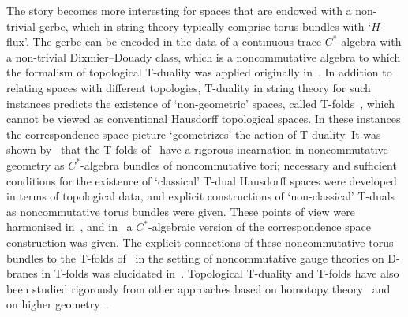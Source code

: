\documentclass[pdftex]{sigma}
\numberwithin{equation}{section}
\begin{document}
The story becomes more interesting for spaces that are endowed with a
non-trivial gerbe, which in string theory typically comprise torus
bundles with `$H$-flux'. The gerbe can be encoded in the data of a
continuous-trace $C^*$-algebra with a non-trivial Dixmier--Douady
class, which is a noncommutative algebra to which the formalism of
topological T-duality was applied originally
in~\cite{Bouwknegt2003,Mathai2004,Mathai2005}. In addition to relating
spaces with different topologies, T-duality in string theory for such
instances predicts the existence of `non-geometric' spaces, called T-folds~\cite{Hull2004},
which cannot be viewed as conventional Hausdorff topological
spaces. In these instances the correspondence space picture
`geometrizes' the action of T-duality. It was shown
by~\cite{Bouwknegt2008, Mathai2004,Mathai2005} that the T-folds
of~\cite{Hull2004} have a rigorous incarnation in noncommutative
geometry as $C^*$-algebra bundles of noncommutative tori; necessary
and sufficient conditions for the existence of `classical' T-dual
Hausdorff spaces were developed in terms of topological data, and explicit constructions of `non-classical'
T-duals as noncommutative torus bundles were given. These points of view were harmonised
in~\cite{Brodzki2006}, and in~\cite{Brodzki2007} a $C^*$-algebraic
version of the correspondence space construction was given. The explicit connections of these
noncommutative torus bundles to the T-folds of~\cite{Hull2004} in the
setting of noncommutative gauge theories on D-branes in T-folds
was elucidated
in~\cite{Ellwood2006,Grange2006,Hull2019, Lowe2003}. Topological
T-duality and T-folds have also been studied rigorously from other
approaches based on homotopy
theory~\cite{Bunke2006, Bunke2005} and on higher
geometry~\cite{Nikolaus2018}.
\end{document}
